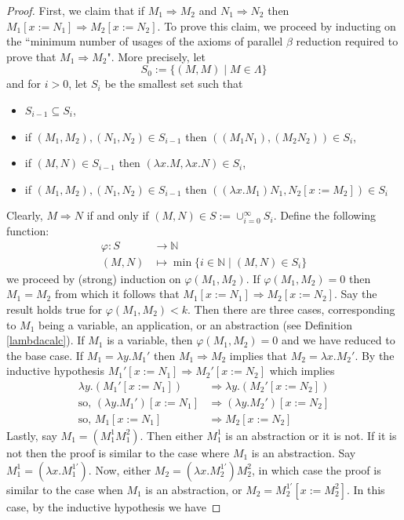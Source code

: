 \documentclass[12pt]{article}
\theoremstyle{plane}
\theoremstyle{definition}
\newcommand{\bb}[1]{\mathbb{#1}}
\begin{document}
\begin{proof}
		First, we claim that if $M_1 \Rightarrow M_2$ and $N_1 \Rightarrow N_2$ then $M_1[x := N_1] \Rightarrow M_2[x := N_2]$. To prove this claim, we proceed by inducting on the ``minimum number of usages of the axioms of parallel $\beta$ reduction required to prove that $M_1 \Rightarrow M_2$". More precisely, let
		\[S_0 := \lbrace (M,M) \mid M \in \Lambda \rbrace\]
		and for $i>0$, let $S_i$ be the smallest set such that
		\begin{itemize}
			\item $S_{i-1} \subseteq S_i$,
			\item if $(M_1,M_2),(N_1,N_2) \in S_{i - 1}$ then $((M_1N_1),(M_2N_2)) \in S_i$,
			\item if $(M,N) \in S_{i-1}$ then $(\lambda x. M,\lambda x. N) \in S_{i}$,
			\item if $(M_1,M_2),(N_1,N_2) \in S_{i-1}$ then $((\lambda x. M_1)N_1,N_2[x := M_2]) \in S_i$
		\end{itemize}
		Clearly, $M \Rightarrow N$ if and only if $(M,N) \in S := \cup_{i = 0}^\infty S_i$. Define the following function:
		\begin{align*}
			\varphi: S &\to \bb{N}\\
			(M,N) &\mapsto \operatorname{min}\lbrace i \in \bb{N} \mid (M,N) \in S_i\rbrace
		\end{align*}
		we proceed by (strong) induction on $\varphi(M_1,M_2)$. If $\varphi(M_1,M_2) = 0$ then $M_1 = M_2$ from which it follows that $M_1[x := N_1] \Rightarrow M_2[x := N_2]$. Say the result holds true for $\varphi(M_1,M_2) < k$. Then there are three cases, corresponding to $M_1$ being a variable, an application, or an abstraction (see Definition \ref{lambdacalc}). If $M_1$ is a variable, then $\varphi(M_1,M_2) = 0$ and we have reduced to the base case. If $M_1 = \lambda y. M_1'$ then $M_1 \Rightarrow M_2$ implies that $M_2 = \lambda x. M_2'$. By the inductive hypothesis $M_1'[x := N_1] \Rightarrow M_2'[x :=N_2]$ which implies
		\begin{align*}
			\lambda y. (M_1'[x := N_1]) &\Rightarrow \lambda y. (M_2'[x :=N_2])\\
			\text{so, }(\lambda y. M_1')[x := N_1] &\Rightarrow (\lambda y. M_2')[x :=N_2]\\
			\text{so, }M_1[x := N_1] &\Rightarrow M_2[x := N_2]
		\end{align*}
		Lastly, say $M_1 = (M_1^1 M_1^2)$. Then either $M_1^1$ is an abstraction or it is not. If it is not then the proof is similar to the case where $M_1$ is an abstraction. Say $M_1^1 = (\lambda x. M_1^{1'})$. Now, either $M_2 = (\lambda x. M_2^{1'})M_2^2$, in which case the proof is similar to the case when $M_1$ is an abstraction, or $M_2 = M_2^{1'}[x := M_2^2]$. In this case, by the inductive hypothesis we have

\end{proof}
\end{document}
